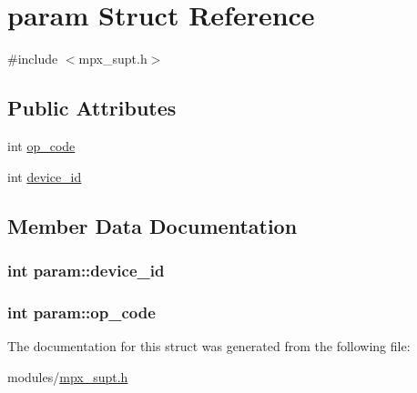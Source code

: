 \hypertarget{structparam}{}\section{param Struct Reference}
\label{structparam}


{\ttfamily \#include $<$mpx\+\_\+supt.\+h$>$}

\subsection*{Public Attributes}
\begin{DoxyCompactItemize}
\item 
int \hyperlink{structparam_a81c8b24055c2908ebe480598aba6044c}{op\+\_\+code}
\item 
int \hyperlink{structparam_a44a7285b02749114186a9f9971941bcb}{device\+\_\+id}
\end{DoxyCompactItemize}


\subsection{Member Data Documentation}
\hypertarget{structparam_a44a7285b02749114186a9f9971941bcb}{}
\subsubsection[{device\+\_\+id}]{\setlength{\rightskip}{0pt plus 5cm}int param\+::device\+\_\+id}\label{structparam_a44a7285b02749114186a9f9971941bcb}
\hypertarget{structparam_a81c8b24055c2908ebe480598aba6044c}{}
\subsubsection[{op\+\_\+code}]{\setlength{\rightskip}{0pt plus 5cm}int param\+::op\+\_\+code}\label{structparam_a81c8b24055c2908ebe480598aba6044c}


The documentation for this struct was generated from the following file\+:\begin{DoxyCompactItemize}
\item 
modules/\hyperlink{mpx__supt_8h}{mpx\+\_\+supt.\+h}\end{DoxyCompactItemize}
